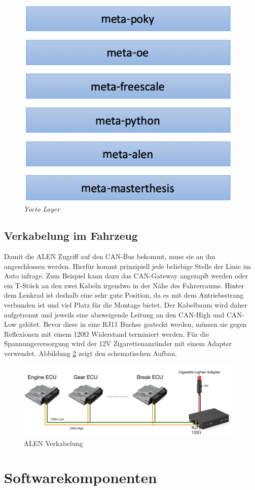 \begin{figure}[htbp]
	\centering
    \includegraphics[width=.4\textwidth]{images/yocto_layer.png}
	\caption{\textit{Yocto Layer}}
	\label{fig:yocto_layer}
\end{figure}

\subsection{Verkabelung im Fahrzeug}

Damit die ALEN Zugriff auf den CAN-Bus bekommt, muss sie an ihn angeschlossen werden. Hierfür kommt prinzipiell jede beliebige Stelle der Linie im Auto infrage. Zum Beispiel kann dazu das CAN-Gateway angezapft werden oder ein T-Stück an den zwei Kabeln irgendwo in der Nähe des Fahrerraums. Hinter dem Lenkrad ist deshalb eine sehr gute Position, da es mit dem Antriebsstrang verbunden ist und viel Platz für die Montage bietet. Der Kabelbaum wird daher aufgetrennt und jeweils eine abzweigende Leitung an den CAN-High und CAN-Low gelötet. Bevor diese in eine RJ11 Buchse gesteckt werden, müssen sie gegen Reflexionen mit einem 120\si{\ohm} Widerstand terminiert werden. Für die Spannungsversorgung wird der 12V Zigarettenanzünder mit einem Adapter verwendet. Abbildung \ref{fig:alen_wireing} zeigt den schematischen Aufbau.

\begin{figure}[htbp]
	\centering
    \includegraphics[width=.6\textwidth]{images/alen_wireing.png}
	\caption{ALEN Verkabelung}
	\label{fig:alen_wireing}
\end{figure}

\section{Softwarekomponenten}
\label{sec:software_compontens}


